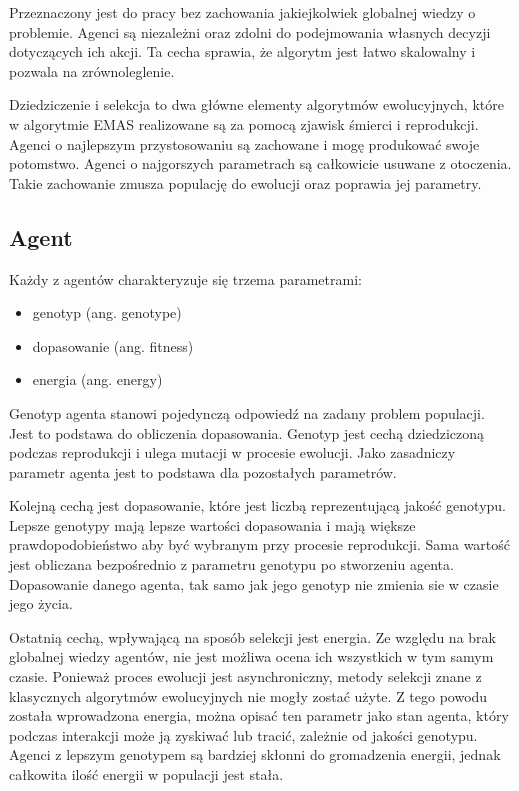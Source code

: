 Przeznaczony jest do pracy bez zachowania jakiejkolwiek globalnej wiedzy o problemie. Agenci są niezależni oraz zdolni do podejmowania własnych decyzji dotyczących ich akcji. Ta cecha sprawia, że algorytm jest łatwo skalowalny i pozwala na zrównoleglenie. 

Dziedziczenie i selekcja to dwa główne elementy algorytmów ewolucyjnych, które w algorytmie EMAS realizowane są za pomocą zjawisk śmierci i reprodukcji. Agenci o najlepszym przystosowaniu są zachowane i mogę produkować swoje potomstwo. Agenci o najgorszych parametrach są całkowicie usuwane z otoczenia. Takie zachowanie zmusza populację do ewolucji oraz poprawia jej parametry\cite{emas2}.

\subsection{Agent}
\label{sec:agentgenetyczny}
Każdy z agentów charakteryzuje się trzema parametrami:
\begin {itemize}
\item genotyp (ang. genotype)
\item dopasowanie (ang. fitness)
\item energia (ang. energy)
\end {itemize}
Genotyp agenta stanowi pojedynczą odpowiedź na zadany problem populacji. Jest to podstawa do obliczenia dopasowania. Genotyp jest cechą dziedziczoną podczas reprodukcji i ulega mutacji w procesie ewolucji. Jako zasadniczy parametr agenta jest to podstawa dla pozostałych parametrów.

Kolejną cechą jest dopasowanie, które jest liczbą reprezentującą jakość genotypu. Lepsze genotypy mają lepsze wartości dopasowania i mają większe prawdopodobieństwo aby być wybranym przy procesie reprodukcji. Sama wartość jest obliczana bezpośrednio z parametru genotypu po stworzeniu agenta. Dopasowanie danego agenta, tak samo jak jego genotyp nie zmienia sie w czasie jego życia.

Ostatnią cechą, wpływającą na sposób selekcji jest energia. Ze względu na brak globalnej wiedzy agentów, nie jest możliwa ocena ich wszystkich w tym samym czasie. Ponieważ proces ewolucji jest asynchroniczny, metody selekcji znane z klasycznych algorytmów ewolucyjnych nie mogły zostać użyte. Z tego powodu została wprowadzona energia, można opisać ten parametr jako stan agenta, który podczas interakcji może ją zyskiwać lub tracić, zależnie od jakości genotypu. Agenci z lepszym genotypem są bardziej skłonni do gromadzenia energii, jednak całkowita ilość energii w populacji jest stała.

